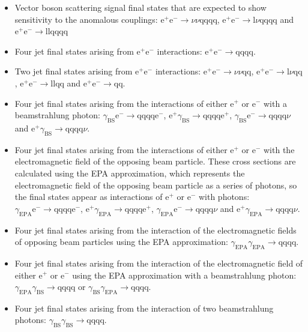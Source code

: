 \begin{itemize}
\item Vector boson scattering signal final states that are expected to show sensitivity to the anomalous couplings: $\text{e}^{+}\text{e}^{-} \rightarrow \nu\nu\text{qqqq}$, $\text{e}^{+}\text{e}^{-} \rightarrow \text{l}\nu\text{qqqq}$ and $\text{e}^{+}\text{e}^{-} \rightarrow \text{llqqqq}$
\item Four jet final states arising from $\text{e}^{+}\text{e}^{-}$ interactions: $\text{e}^{+}\text{e}^{-} \rightarrow \text{qqqq}$.
\item Two jet final states arising from $\text{e}^{+}\text{e}^{-}$ interactions: $\text{e}^{+}\text{e}^{-} \rightarrow \nu{\nu}\text{qq}$, $\text{e}^{+}\text{e}^{-} \rightarrow \text{l}\nu\text{qq}$, $\text{e}^{+}\text{e}^{-} \rightarrow \text{llqq}$ and $\text{e}^{+}\text{e}^{-} \rightarrow \text{qq}$.
\item Four jet final states arising from the interactions of either $\text{e}^{+}$ or $\text{e}^{-}$ with a beamstrahlung photon: $\gamma_{\text{BS}}\text{e}^{-} \rightarrow \text{qqqq}\text{e}^{-}$, $\text{e}^{+}\gamma_{\text{BS}} \rightarrow \text{qqqq}\text{e}^{+}$, $\gamma_{\text{BS}}\text{e}^{-} \rightarrow \text{qqqq}\nu$ and $\text{e}^{+}\gamma_{\text{BS}} \rightarrow \text{qqqq}\nu$.
\item Four jet final states arising from the interactions of either $\text{e}^{+}$ or $\text{e}^{-}$ with the electromagnetic field of the opposing beam particle.  These cross sections are calculated using the EPA approximation, which represents the electromagnetic field of the opposing beam particle as a series of photons, so the final states appear as interactions of $\text{e}^{+}$ or $\text{e}^{-}$ with photons: $\gamma_{\text{EPA}}\text{e}^{-} \rightarrow \text{qqqq}\text{e}^{-}$, $\text{e}^{+}\gamma_{\text{EPA}} \rightarrow \text{qqqq}\text{e}^{+}$, $\gamma_{\text{EPA}}\text{e}^{-} \rightarrow \text{qqqq}\nu$ and $\text{e}^{+}\gamma_{\text{EPA}} \rightarrow \text{qqqq}\nu$.
\item Four jet final states arising from the interaction of the electromagnetic fields of opposing beam particles using the EPA approximation: $\gamma_{\text{EPA}}\gamma_{\text{EPA}} \rightarrow \text{qqqq}$.
\item Four jet final states arising from the interaction of the electromagnetic field of either $\text{e}^{+}$ or $\text{e}^{-}$ using the EPA approximation with a beamstrahlung photon: $\gamma_{\text{EPA}}\gamma_{\text{BS}} \rightarrow \text{qqqq}$ or $\gamma_{\text{BS}}\gamma_{\text{EPA}} \rightarrow \text{qqqq}$.
\item Four jet final states arising from the interaction of two beamstrahlung photons: $\gamma_{\text{BS}}\gamma_{\text{BS}} \rightarrow \text{qqqq}$.
\end{itemize}

